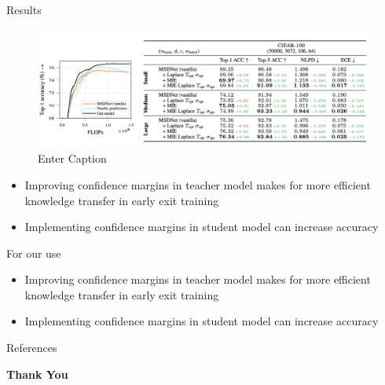 \documentclass[aspectratio=169,xcolor=dvipsnames]{beamer}
\begin{document}
\begin{frame}{Results}

    \begin{figure}
        \centering
        \includegraphics[width=0.8\linewidth]{figs/Screenshot 2025-04-08 at 15.40.28.png}
        \caption{Enter Caption}
        \label{fig:enter-label}
    \end{figure}
    \begin{itemize}
        \item Improving confidence margins in teacher model makes for more efficient knowledge transfer in early exit training
        \item Implementing confidence margins in student model can increase accuracy

    \end{itemize}
\end{frame}

\begin{frame}{For our use}
    \begin{itemize}
        \item Improving confidence margins in teacher model makes for more efficient knowledge transfer in early exit training
        \item Implementing confidence margins in student model can increase accuracy

    \end{itemize}
\end{frame}

\begin{frame}{References}
    \footnotesize
    
    
\end{frame}


\begin{frame}
    \Huge{\centerline{\textbf{Thank You}}}
\end{frame}

\end{document}
